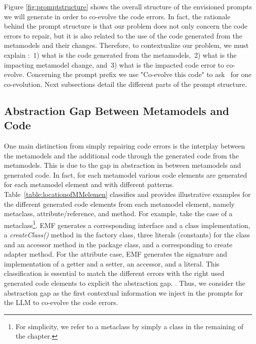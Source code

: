 Figure \ref{fig:promptstructure} shows the overall structure of the envisioned prompts we will generate in order to co-evolve the code errors. In fact, the rationale behind the prompt structure is that our problem does not only concern the code errors to repair, but it is also related to the use of the code generated from the metamodels and their changes. Therefore, to contextualize our problem, we must explain :~1) what is the code generated from the metamodels,~2) what is the impacting metamodel change, and~3) what is the impacted code error to co-evolve.  Concerning the prompt prefix we use "Co-evolve this code" to ask \LLM~for one co-evolution. Next subsections detail the different parts of the prompt structure. 

\subsection{Abstraction Gap Between Metamodels and Code}

One main distinction from simply repairing code errors is the interplay between the metamodels and the additional code through the generated code from the metamodels. This is due to the gap in abstraction in between metamodels and generated code. In fact, for each metamodel various code elements are generated for each metamodel element and with different patterns.
Table~\ref{table:locationofMMelemen} classifies and provides illustrative examples for the different generated code elements from each metamodel element, namely metaclass, attribute/reference, and method.  %
For example, take the case of a metaclass\footnote{For simplicity, we refer to a metaclass by simply a class in the remaining of the chapter.}. EMF generates a corresponding interface and a class implementation, a \emph{createClass()} method in the factory class, three literals (\ie constants) for the class and an accessor method in the package class, and a corresponding to create adapter method. For the attribute case, EMF generates the signature and implementation of a getter and a setter, an accessor, and a literal. 
This classification is essential to match the different errors with the right used generated code elements to explicit the abstraction gap. . Thus, we consider the abstraction gap as the first contextual information we inject in the prompts for the LLM to co-evolve the code errors. 

